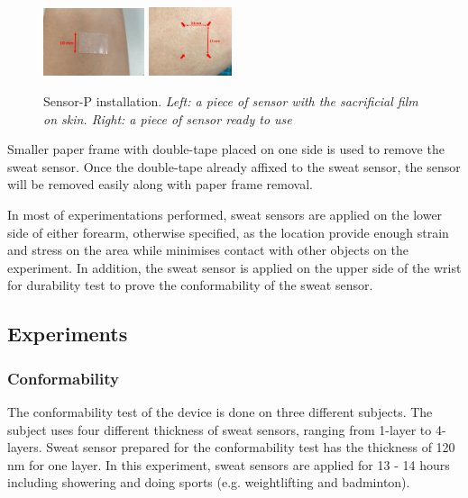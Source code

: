 \documentclass[journal]{IEEEtran}
\begin{document}
\begin{figure}[H]
\begin{center}
\includegraphics[width=0.265\textwidth]{images/sacrificial.png}
\includegraphics[width=0.217\textwidth]{images/membrane_size.png}
\caption{Sensor-P installation. \textit{Left: a piece of sensor with the sacrificial film on skin. Right: a piece of sensor ready to use}} \label{fig:sensorp}
\end{center}
\end{figure}

Smaller paper frame with double-tape placed on one side is used to remove the sweat sensor. Once the double-tape already affixed to the sweat sensor, the sensor will be removed easily along with paper frame removal. 

In most of experimentations performed, sweat sensors are applied on the lower side of either forearm, otherwise specified, as the location provide enough strain and stress on the area while minimises contact with other objects on the experiment. In addition, the sweat sensor is applied on the upper side of the wrist for durability test to prove the conformability of the sweat sensor.

\subsection{Experiments}
\subsubsection{Conformability}

The conformability test of the device is done on three different subjects. The subject uses four different thickness of sweat sensors, ranging from 1-layer to  4-layers. Sweat sensor prepared for the conformability test has the thickness of 120 nm for one layer. In this experiment, sweat sensors are applied for 13 - 14 hours including showering and doing sports (e.g. weightlifting and badminton).
\end{document}
